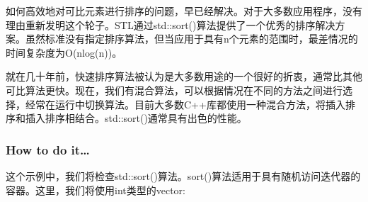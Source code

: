 
如何高效地对可比元素进行排序的问题，早已经解决。对于大多数应用程序，没有理由重新发明这个轮子。STL通过std::sort()算法提供了一个优秀的排序解决方案。虽然标准没有指定排序算法，但当应用于具有n个元素的范围时，最差情况的时间复杂度为O(nlog(n))。

就在几十年前，快速排序算法被认为是大多数用途的一个很好的折衷，通常比其他可比算法更快。现在，我们有混合算法，可以根据情况在不同的方法之间进行选择，经常在运行中切换算法。目前大多数C++库都使用一种混合方法，将插入排序和插入排序相结合。std::sort()通常具有出色的性能。

\subsubsection{How to do it…}

这个示例中，我们将检查std::sort()算法。sort()算法适用于具有随机访问迭代器的容器。这里，我们将使用int类型的vector:

